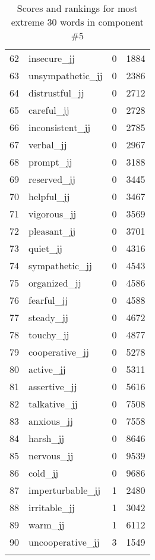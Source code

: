 \begin{longtable}[!htbp]{| rlr@{.}l |}
    62 & insecure\_jj & 0 & 1884 \\
    63 & unsympathetic\_jj & 0 & 2386 \\
    64 & distrustful\_jj & 0 & 2712 \\
    65 & careful\_jj & 0 & 2728 \\
    66 & inconsistent\_jj & 0 & 2785 \\
    67 & verbal\_jj & 0 & 2967 \\
    68 & prompt\_jj & 0 & 3188 \\
    69 & reserved\_jj & 0 & 3445 \\
    70 & helpful\_jj & 0 & 3467 \\
    71 & vigorous\_jj & 0 & 3569 \\
    72 & pleasant\_jj & 0 & 3701 \\
    73 & quiet\_jj & 0 & 4316 \\
    74 & sympathetic\_jj & 0 & 4543 \\
    75 & organized\_jj & 0 & 4586 \\
    76 & fearful\_jj & 0 & 4588 \\
    77 & steady\_jj & 0 & 4672 \\
    78 & touchy\_jj & 0 & 4877 \\
    79 & cooperative\_jj & 0 & 5278 \\
    80 & active\_jj & 0 & 5311 \\
    81 & assertive\_jj & 0 & 5616 \\
    82 & talkative\_jj & 0 & 7508 \\
    83 & anxious\_jj & 0 & 7558 \\
    84 & harsh\_jj & 0 & 8646 \\
    85 & nervous\_jj & 0 & 9539 \\
    86 & cold\_jj & 0 & 9686 \\
    87 & imperturbable\_jj & 1 & 2480 \\
    88 & irritable\_jj & 1 & 3042 \\
    89 & warm\_jj & 1 & 6112 \\
    90 & uncooperative\_jj & 3 & 1549 \\
    \hline
    \caption{Scores and rankings for most extreme 30 words in component \#5} \\
\end{longtable}

